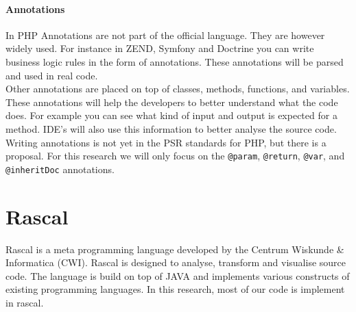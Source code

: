 \documentclass[../main.tex]{subfiles}
\begin{document}
    

    \paragraph{Annotations}
    In PHP Annotations are not part of the official language.
    They are however widely used. 
    For instance in ZEND, Symfony and Doctrine you can write business logic rules in the form of annotations.
    These annotations will be parsed and used in real code.
    \\
    Other annotations are placed on top of classes, methods, functions, and variables.
    These annotations will help the developers to better understand what the code does. 
    For example you can see what kind of input and output is expected for a method.
    IDE's will also use this information to better analyse the source code.
    \\
    Writing annotations is not yet in the PSR standards for PHP, but there is a proposal\footnotemark.
    For this research we will only focus on the \texttt{@param}, \texttt{@return}, \texttt{@var}, and \texttt{@inheritDoc} annotations.
    
    \section{Rascal}
    \Gls{Rascal} is a meta programming language developed by the Centrum Wiskunde \& Informatica (CWI)\cite{Kli:09}.
    Rascal is designed to analyse, transform and visualise source code.
    The language is build on top of JAVA and implements various constructs of existing programming languages.
    In this research, most of our code is implement in rascal.
\end{document}
